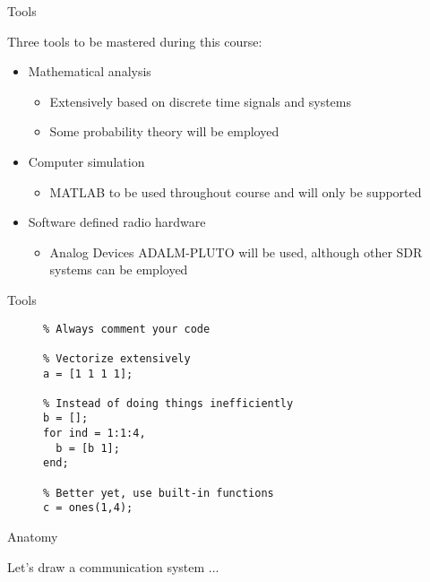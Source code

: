 \documentclass[10pt]{beamer}
\begin{document}

\begin{frame}[fragile]{Tools}

Three tools to be mastered during this course:
 \begin{itemize}
 \item Mathematical analysis
 \begin{itemize}
  \item Extensively based on discrete time signals and systems
  \item Some probability theory will be employed
 \end{itemize}
 \item Computer simulation
 \begin{itemize}
  \item MATLAB to be used throughout course and will only be supported
 \end{itemize}
 \item Software defined radio hardware
 \begin{itemize}
  \item Analog Devices ADALM-PLUTO will be used, although other SDR systems can be employed
 \end{itemize}
 \end{itemize}

\end{frame}



\begin{frame}[fragile]{Tools}

\begin{figure}
\centering
\begin{minipage}[framed]{0.9\textwidth}
\begin{lstlisting}
% Always comment your code

% Vectorize extensively
a = [1 1 1 1];

% Instead of doing things inefficiently
b = [];
for ind = 1:1:4,
  b = [b 1];
end;

% Better yet, use built-in functions
c = ones(1,4);
\end{lstlisting}
\end{minipage}
\captionsetup{labelformat=empty}
\end{figure}

\end{frame}


\begin{frame}[fragile]{Anatomy}

\centering
Let's draw a communication system ...

\end{frame}


\end{document}
